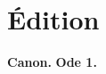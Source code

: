 \documentclass[12pt,twoside]{book}
\begin{document}


\section{Édition}\sloppy

\begin{pages}
\begin{Leftside}
\beginnumbering
\begin{russian}

\pstart
\begin{center}
\textbf{Canon.}\skipnumbering 
\textbf{Ode 1.}\skipnumbering
\end{center}
\pend


\end{russian}
\end{Leftside}
\end{pages}
\end{document}
